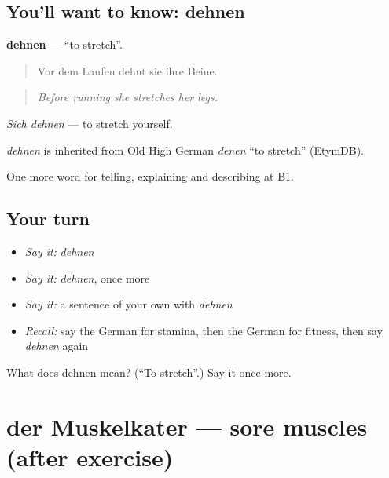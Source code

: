 \subsection*{You'll want to know: dehnen}
\textbf{dehnen} — \textquotedblleft{}to stretch\textquotedblright{}.

\begin{quote}
Vor dem Laufen dehnt sie ihre Beine.
\end{quote}

\begin{quote}
\emph{Before running she stretches her legs.}
\end{quote}

\emph{Sich dehnen} — to stretch yourself.

\begin{cousinweb}
\emph{dehnen} is inherited from Old High German \emph{denen} \textquotedblleft{}to stretch\textquotedblright{} (EtymDB).
\end{cousinweb}

\begin{grammarlens}[title={What you've built}]
One more word for telling, explaining and describing at B1.
\end{grammarlens}

\subsection*{Your turn}
\begin{itemize}
\raggedright
  \item \emph{Say it:} \emph{dehnen}
  \item \emph{Say it:} \emph{dehnen}, once more
  \item \emph{Say it:} a sentence of your own with \emph{dehnen}
  \item \emph{Recall:} say the German for stamina, then the German for fitness, then say \emph{dehnen} again
\end{itemize}

\begin{tcolorbox}[breakable,colback=teal!4,colframe=teal!35!black,title={Before you move on}]
What does dehnen mean? (\textquotedblleft{}To stretch\textquotedblright{}.) Say it once more.
\end{tcolorbox}
\section[der Muskelkater]{der Muskelkater — sore muscles (after exercise)}

